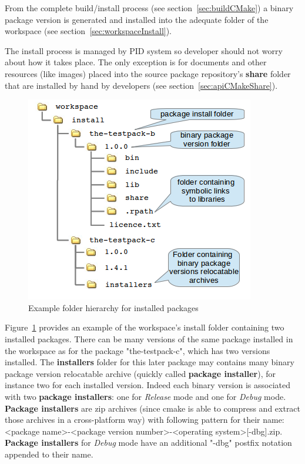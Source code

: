 \documentclass[12pt,a4paper]{article}
\begin{document}
From the complete build/install process (see section~\ref{sec:buildCMake}) a binary package version is generated and installed into the adequate folder of the workspace (see section~\ref{sec:workspaceInstall}). 

The install process is managed by PID system so developer should not worry about how it takes place. The only exception is for documents and other resources (like images) placed into the source package repository's \textbf{share} folder that are installed by hand by developers (see section~\ref{sec:apiCMakeShare}).

\begin{figure}
\center
\includegraphics[scale=1]{images/installedBinaryPackage.png}
\caption{Example folder hierarchy for installed packages}
\label{fig:installBinaryFolder}
\end{figure}

Figure~\ref{fig:installBinaryFolder} provides an example of the workspace's install folder containing two installed packages. There can be many versions of the same package installed in the workspace as for the package "the-testpack-c", which has two versions installed. The \textbf{installers} folder for this later package may contains many binary package version relocatable archive (quickly called \textbf{package installer}), for instance two for each installed version. Indeed each binary version is associated with two \textbf{package installers}: one for \textit{Release} mode and one for \textit{Debug} mode. \textbf{Package installers} are zip archives (since cmake is able to compress and extract those archives in a cross-platform way) with following pattern for their name: <package name>-<package version number>-<operating system>[-dbg].zip. \textbf{Package installers} for \textit{Debug} mode have an additional "-dbg" postfix notation appended to their name.
\end{document}
